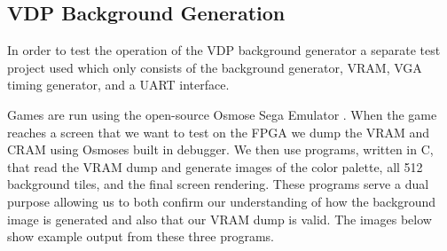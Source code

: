 \documentclass{article}
\begin{document}
\subsection{VDP Background Generation}

In order to test the operation of the VDP background generator a separate test
project used which only consists of the background generator, VRAM, VGA timing
generator, and a UART interface.

Games are run using the open-source Osmose Sega Emulator \cite{osmose}. When
the game reaches a screen that we want to test on the FPGA we dump the VRAM and
CRAM using Osmoses built in debugger. We then use programs, written in C, that
read the VRAM dump and generate images of the color palette, all 512 background
tiles, and the final screen rendering.  These programs serve a dual purpose
allowing us to both confirm our understanding of how the background image is
generated and also that our VRAM dump is valid. The images below show example
output from these three programs.
\vfill
\end{document}
